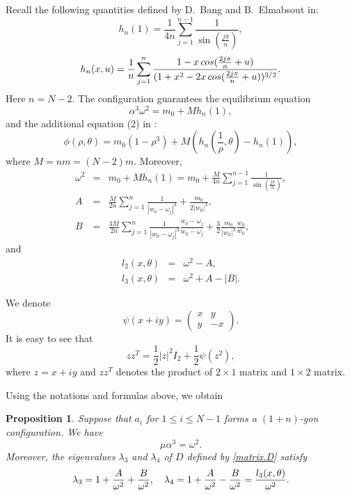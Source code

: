 \documentclass[11pt]{article}
\newtheorem{proposition}[lemma]{Proposition}
\def\th{{\theta}}
\def\om{{\omega}}
\def\lm{{\lambda}}
\def\ol#1{\overline{#1}}
\begin{document}
 Recall the following quantities defined by D.~Bang and B.~Elmabsout in\cite{BaE}:
$$h_n(1)=\frac{1}{4n}\sum_{j=1}^{n-1}\frac{1}{\sin(\frac{j\pi}{n})},$$
$$h_n(x,u)=\frac{1}{n}\sum_{j=1}^{n}\frac{1-x\thinspace cos(\frac{2j\pi}{n}+u)}{(1+x^2-2x\thinspace cos(\frac{2j\pi}{n}+u))^{3/2}}.$$
Here $n=N-2$.
The configuration guarantees the equilibrium equation
$$\alpha^3\omega^2=m_0+Mh_n(1),$$
and the additional equation (2) in \cite{BaE}:
$$\phi(\rho,\theta)=m_0(1-\rho^3)+M(h_n(\frac{1}{\rho},\theta)-h_n(1)),$$
where $M=nm=(N-2)m$.
Moreover,
 \begin{eqnarray}
 \omega^2&=&m_0+Mh_n(1)=m_0+\frac{M}{4n}\sum_{j=1}^{n-1}\frac{1}{\sin(\frac{j\pi}{n})},
 \\
 A&=&\frac{M}{2n}\sum_{j=1}^{n}\frac{1}{|w_0-\omega_j|^3}+\frac{m_0}{2|w_0|^3},
 \\
 B &=& \frac{3M}{2n}\sum_{j=1}^{n}\frac{1}{|w_0-\omega_j|^3}\frac{w_0-\om_j}{\ol{w_0-\om_j}}
 +\frac{3}{2}\frac{m_0}{|w_0|^3}\frac{w_0}{\ol{w_0}},
 \end{eqnarray}
 and
\begin{eqnarray}
l_2(x,\th)&=&\omega^2-A,
\\
l_3(x,\th)&=&\omega^2+A-|B|.
\end{eqnarray}
 
 \par 
 We denote 
 $$\psi(x+iy)=\left(\begin{array}{ll}
 x&y\\
 y&-x
 \end{array}
 \right).
 $$
 It is easy to see that 
 $$
 zz^{T}=\frac{1}{2}|z|^2I_{2}+\frac{1}{2}\psi(z^{2}),
 $$
 where $z=x+iy$ and $zz^{T}$ denotes the product of $2\times 1$ matrix and $1\times 2$ matrix.
 
 Using the notations and formulas above, we obtain

 \begin{proposition}\label{polygon.prop.lm3.lm4}
	Suppose that $a_i$ for $1\leq i \leq N-1$ forms a $(1+n)$-gon configuration. We have
    $$\mu\alpha^3=\omega^2.$$
    Moreover, the eigenvalues $\lm_3$ and $\lm_4$ of $D$ defined by \eqref{matrix.D} satisfy
	\begin{align}
	\lm_3 = 1+{A\over\omega^2}+{B\over\omega^2},\quad
	\lm_4 = 1+{A\over\omega^2}-{B\over\omega^2}={l_3(x,\theta)\over\omega^2}.
	\end{align}
\end{proposition}
\end{document}
